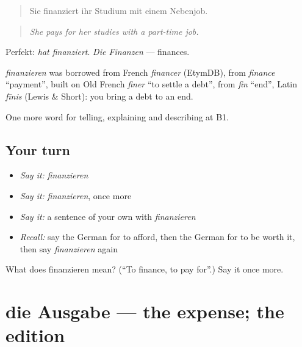 \begin{quote}
Sie finanziert ihr Studium mit einem Nebenjob.
\end{quote}

\begin{quote}
\emph{She pays for her studies with a part-time job.}
\end{quote}

Perfekt: \emph{hat finanziert}. \emph{Die Finanzen} — finances.

\begin{cousinweb}
\emph{finanzieren} was borrowed from French \emph{financer} (EtymDB), from \emph{finance} \textquotedblleft{}payment\textquotedblright{}, built on Old French \emph{finer} \textquotedblleft{}to settle a debt\textquotedblright{}, from \emph{fin} \textquotedblleft{}end\textquotedblright{}, Latin \emph{fīnis} (Lewis \& Short): you bring a debt to an end.
\end{cousinweb}

\begin{grammarlens}[title={What you've built}]
One more word for telling, explaining and describing at B1.
\end{grammarlens}

\subsection*{Your turn}
\begin{itemize}
\raggedright
  \item \emph{Say it:} \emph{finanzieren}
  \item \emph{Say it:} \emph{finanzieren}, once more
  \item \emph{Say it:} a sentence of your own with \emph{finanzieren}
  \item \emph{Recall:} say the German for to afford, then the German for to be worth it, then say \emph{finanzieren} again
\end{itemize}

\begin{tcolorbox}[breakable,colback=teal!4,colframe=teal!35!black,title={Before you move on}]
What does finanzieren mean? (\textquotedblleft{}To finance, to pay for\textquotedblright{}.) Say it once more.
\end{tcolorbox}
\section[die Ausgabe]{die Ausgabe — the expense; the edition}

